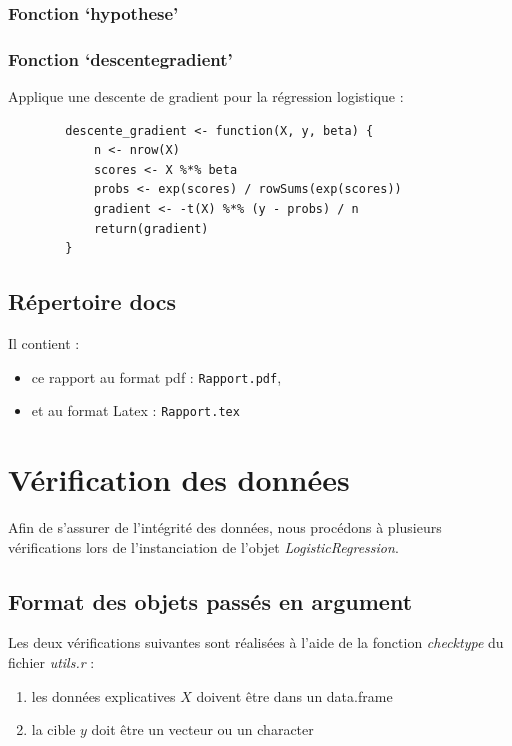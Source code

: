 \documentclass[10pt,french]{report}
\begin{document}
	\subsubsection{Fonction \enquote*{hypothese}}

	\subsubsection{Fonction \enquote*{descente\textunderscore gradient}}

	Applique une descente de gradient pour la régression logistique :
	\begin{verbatim}
		descente_gradient <- function(X, y, beta) {
			n <- nrow(X)
			scores <- X %*% beta
			probs <- exp(scores) / rowSums(exp(scores))
			gradient <- -t(X) %*% (y - probs) / n
			return(gradient)
		}
	\end{verbatim}

	\subsection{Répertoire docs}

	Il contient :
	\begin{itemize}
		\item ce rapport au format pdf : \texttt{Rapport.pdf},
		\item et au format Latex : \texttt{Rapport.tex}
	\end{itemize}

	\section{Vérification des données}
	Afin de s'assurer de l'intégrité des données, nous procédons à plusieurs vérifications lors de l'instanciation de l'objet \textit{LogisticRegression}.

	\subsection{Format des objets passés en argument}

	Les deux vérifications suivantes sont réalisées à l'aide de la fonction \textit{check\textunderscore type} du fichier \textit{utils.r} :

	\begin{enumerate}
		\item les données explicatives $X$ doivent être dans un data.frame
		\item la cible $y$ doit être un vecteur ou un character
	\end{enumerate}
\end{document}
